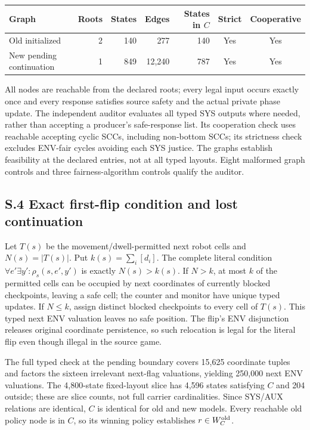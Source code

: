 \begin{center}
\begin{tabular}{lrrrrcc}\toprule
Graph & Roots & States & Edges & States in $C$ & Strict & Cooperative\\\midrule
Old initialized &2&140&277&140&Yes&Yes\\
New pending continuation &1&849&12,240&787&Yes&Yes\\\bottomrule
\end{tabular}
\end{center}
All nodes are reachable from the declared roots; every legal input occurs
exactly once and every response satisfies source safety and the actual
private phase update. The independent auditor evaluates all typed SYS
outputs where needed, rather than accepting a producer's safe-response
list. Its cooperation check uses reachable accepting cyclic SCCs, including
non-bottom SCCs; its strictness check excludes ENV-fair cycles avoiding
each SYS justice. The graphs establish feasibility at the declared entries,
not at all typed layouts. Eight malformed graph controls and three
fairness-algorithm controls qualify the auditor.

\subsection*{S.4 Exact first-flip condition and lost continuation}
Let $T(s)$ be the movement/dwell-permitted next robot cells and
$N(s)=|T(s)|$. Put $k(s)=\sum_i[d_i]$. The complete literal condition
$\forall e'\exists y':\rho_s(s,e',y')$ is exactly $N(s)>k(s)$.
If $N>k$, at most $k$ of the permitted cells can be occupied by next
coordinates of currently blocked checkpoints, leaving a safe cell;
the counter and monitor have unique typed updates. If $N\le k$, assign
distinct blocked checkpoints to every cell of $T(s)$. This typed next
ENV valuation leaves no safe position. The flip's ENV disjunction
releases original coordinate persistence, so such relocation is legal
for the literal flip even though illegal in the source game.

The full typed check at the pending boundary covers 15,625 coordinate
tuples and factors the sixteen irrelevant next-flag valuations, yielding
250,000 next ENV valuations. The 4,800-state fixed-layout slice has 4,596
states satisfying $C$ and 204 outside; these are slice counts, not full
carrier cardinalities. Since SYS/AUX relations are identical, $C$ is
identical for old and new models. Every reachable old policy node is in
$C$, so its winning policy establishes $r\in W_C^{\rm old}$.

